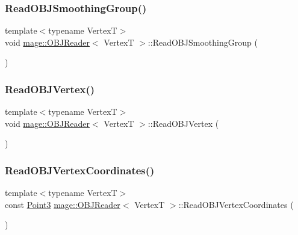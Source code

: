 \hypertarget{classmage_1_1_o_b_j_reader_a2dd830c506ffbfbcd932b9bf75a35c56}{}\label{classmage_1_1_o_b_j_reader_a2dd830c506ffbfbcd932b9bf75a35c56} 
\subsubsection{\texorpdfstring{Read\+O\+B\+J\+Smoothing\+Group()}{ReadOBJSmoothingGroup()}}
{\footnotesize\ttfamily template$<$typename VertexT$>$ \\
void \hyperlink{classmage_1_1_o_b_j_reader}{mage\+::\+O\+B\+J\+Reader}$<$ VertexT $>$\+::Read\+O\+B\+J\+Smoothing\+Group (\begin{DoxyParamCaption}{ }\end{DoxyParamCaption})\hspace{0.3cm}{\ttfamily [private]}}

\hypertarget{classmage_1_1_o_b_j_reader_a70fc61d8cc14dc8efbd73a88188cc511}{}\label{classmage_1_1_o_b_j_reader_a70fc61d8cc14dc8efbd73a88188cc511} 
\subsubsection{\texorpdfstring{Read\+O\+B\+J\+Vertex()}{ReadOBJVertex()}}
{\footnotesize\ttfamily template$<$typename VertexT$>$ \\
void \hyperlink{classmage_1_1_o_b_j_reader}{mage\+::\+O\+B\+J\+Reader}$<$ VertexT $>$\+::Read\+O\+B\+J\+Vertex (\begin{DoxyParamCaption}{ }\end{DoxyParamCaption})\hspace{0.3cm}{\ttfamily [private]}}

\hypertarget{classmage_1_1_o_b_j_reader_ace593a436953e8583b5b4cd721893c44}{}\label{classmage_1_1_o_b_j_reader_ace593a436953e8583b5b4cd721893c44} 
\subsubsection{\texorpdfstring{Read\+O\+B\+J\+Vertex\+Coordinates()}{ReadOBJVertexCoordinates()}}
{\footnotesize\ttfamily template$<$typename VertexT$>$ \\
const \hyperlink{structmage_1_1_point3}{Point3} \hyperlink{classmage_1_1_o_b_j_reader}{mage\+::\+O\+B\+J\+Reader}$<$ VertexT $>$\+::Read\+O\+B\+J\+Vertex\+Coordinates (\begin{DoxyParamCaption}{ }\end{DoxyParamCaption})\hspace{0.3cm}{\ttfamily [private]}}

